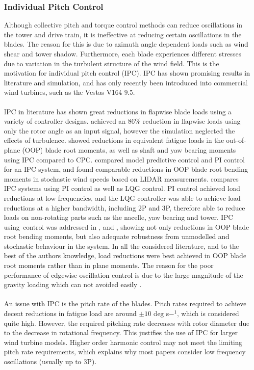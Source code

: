 \subsubsection{Individual Pitch Control}
Although collective pitch and torque control methods can reduce oscillations in the tower and drive train, it is ineffective at reducing certain oscillations in the blades. The reason for this is due to azimuth angle dependent loads such as wind shear and tower shadow. Furthermore, each blade experiences different stresses due to variation in the turbulent structure of the wind field. This is the motivation for individual pitch control (IPC). IPC has shown promising results in literature and simulation, and has only recently been introduced into commercial wind turbines, such as the Vestas V164-9.5.
\\~\\
IPC in literature has shown great reductions in flapwise blade loads using a variety of controller designs. \citet{4_trudnowski} achieved an 86\% reduction in flapwise loads using only the rotor angle as an input signal, however the simulation neglected the effects of turbulence. \citet{5_Bossanyi} showed reductions in equivalent fatigue loads in the out-of-plane (OOP) blade root moments, as well as shaft and yaw bearing moments using IPC compared to CPC. \citet{6_Mirzaei} compared model predictive control and PI control for an IPC system, and found comparable reductions in OOP blade root bending moments in stochastic wind speeds based on LIDAR measurements. \citet{14_Selvam} compares IPC systems using PI control as well as LQG control. PI control achieved load reductions at low frequencies, and the LQG controller was able to achieve load reductions at a higher bandwidth, including 2P and 3P, therefore able to reduce loads on non-rotating parts such as the nacelle, yaw bearing and tower. IPC using~\hinfty control was addressed in \citet{1_Lu}, \citet{2_Kanev} and \citet{17_Geyler}, showing not only reductions in OOP blade root bending moments, but also adequate robustness from unmodelled and stochastic behaviour in the system. In all the considered literature, and to the best of the authors knowledge, load reductions were best achieved in OOP blade root moments rather than in plane moments. The reason for the poor performance of edgewise oscillation control is due to the large magnitude of the gravity loading which can not avoided easily \cite{4_trudnowski}.
\\~\\
An issue with IPC is the pitch rate of the blades. Pitch rates required to achieve decent reductions in fatigue load are around $\pm10$ deg s$-^1$, which is considered quite high\cite{15_bossanyi}. However, the required pitching rate decreases with rotor diameter due to the decrease in rotational frequency. This justifies the use of IPC for larger wind turbine models. Higher order harmonic control may not meet the limiting pitch rate requirements, which explains why most papers consider low frequency oscillations (usually up to 3P). \cite{17_Geyler}
